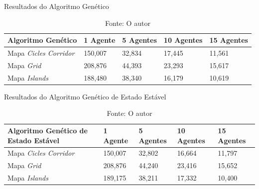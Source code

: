 \begin{table}
	\centering
	\caption{Resultados do Algoritmo Genético}
	\label{result_genetic}
	\begin{tabularx}{\linewidth}{|X|X|X|X|X|}
		\hline
		\textbf{Algoritmo Genético} & \textbf{1 Agente} & \textbf{5 Agentes} & \textbf{10 Agentes} & \textbf{15 Agentes} \\
		\hline
		Mapa \textit{Cicles Corridor} & 150,007 & 32,834 & 17,445 & 11,561 \\
		\hline
		Mapa \textit{Grid} & 208,876 & 44,393 & 23,293 & 15,617 \\
		\hline
		Mapa \textit{Islands} & 188,480 & 38,340 & 16,179 & 10,619 \\
		\hline
	\end{tabularx}
	\caption*{Fonte: O autor}
\end{table}

\begin{table}
	\centering
	\caption{Resultados do Algoritmo Genético de Estado Estável}
	\label{result_ssgenetic}
	\begin{tabularx}{\linewidth}{|X|X|X|X|X|}
		\hline
		\textbf{Algoritmo Genético de Estado Estável} & \textbf{1 Agente} & \textbf{5 Agentes} & \textbf{10 Agentes} & \textbf{15 Agentes} \\
		\hline
		Mapa \textit{Cicles Corridor} & 150,007 & 32,802 & 16,664 & 11,797 \\
		\hline
		Mapa \textit{Grid} & 208,876 & 44,240 & 23,416 & 15,652 \\
		\hline
		Mapa \textit{Islands} & 189,175 & 38,211 & 17,332 & 10,400 \\
		\hline
	\end{tabularx}
	\caption*{Fonte: O autor}
\end{table}

